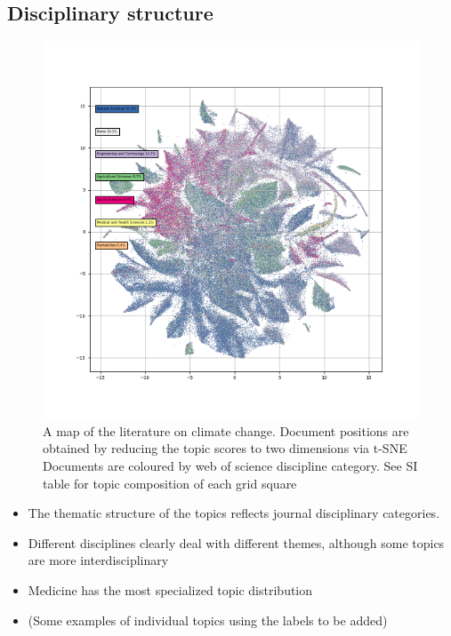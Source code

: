 \documentclass{article}
\begin{document}
\subsection{Disciplinary structure}


\begin{figure}[h!]
	\begin{center}
		\includegraphics[width=1\linewidth]{tsne_results/plots/run_1275_s_0_p100_oecds.png}
		\caption{A map of the literature on climate change. Document positions are obtained by reducing the topic scores to two dimensions via t-SNE Documents are coloured by web of science discipline category. See SI table for topic composition of each grid square}
		\label{map-oecd}
	\end{center}
\end{figure}

\begin{itemize}
	\item The thematic structure of the topics reflects journal disciplinary categories. 
	\item Different disciplines clearly deal with different themes, although some topics are more interdisciplinary 
	\item Medicine has the most specialized topic distribution  
	\item (Some examples of individual topics using the labels to be added)
\end{itemize}
\end{document}
